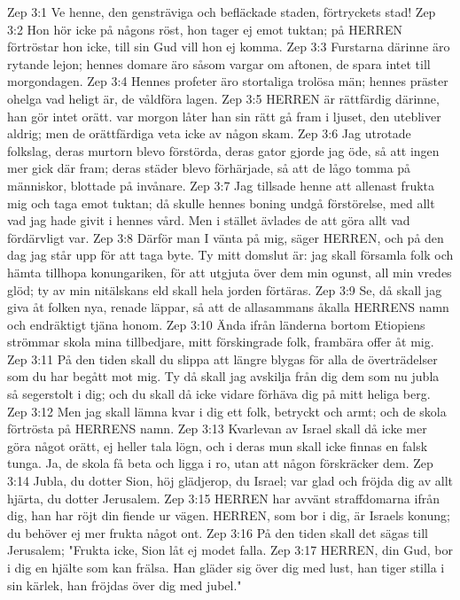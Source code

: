 Zep 3:1  Ve henne, den gensträviga och befläckade staden, förtryckets stad!
Zep 3:2  Hon hör icke på någons röst, hon tager ej emot tuktan; på HERREN förtröstar hon icke, till sin Gud vill hon ej komma.
Zep 3:3  Furstarna därinne äro rytande lejon; hennes domare äro såsom vargar om aftonen, de spara intet till morgondagen.
Zep 3:4  Hennes profeter äro stortaliga trolösa män; hennes präster ohelga vad heligt är, de våldföra lagen.
Zep 3:5  HERREN är rättfärdig därinne, han gör intet orätt. var morgon låter han sin rätt gå fram i ljuset, den utebliver aldrig; men de orättfärdiga veta icke av någon skam.
Zep 3:6  Jag utrotade folkslag, deras murtorn blevo förstörda, deras gator gjorde jag öde, så att ingen mer gick där fram; deras städer blevo förhärjade, så att de lågo tomma på människor, blottade på invånare.
Zep 3:7  Jag tillsade henne att allenast frukta mig och taga emot tuktan; då skulle hennes boning undgå förstörelse, med allt vad jag hade givit i hennes vård. Men i stället ävlades de att göra allt vad fördärvligt var.
Zep 3:8  Därför man I vänta på mig, säger HERREN, och på den dag jag står upp för att taga byte. Ty mitt domslut är: jag skall församla folk och hämta tillhopa konungariken, för att utgjuta över dem min ogunst, all min vredes glöd; ty av min nitälskans eld skall hela jorden förtäras.
Zep 3:9  Se, då skall jag giva åt folken nya, renade läppar, så att de allasammans åkalla HERRENS namn och endräktigt tjäna honom.
Zep 3:10  Ända ifrån länderna bortom Etiopiens strömmar skola mina tillbedjare, mitt förskingrade folk, frambära offer åt mig.
Zep 3:11  På den tiden skall du slippa att längre blygas för alla de överträdelser som du har begått mot mig. Ty då skall jag avskilja från dig dem som nu jubla så segerstolt i dig; och du skall då icke vidare förhäva dig på mitt heliga berg.
Zep 3:12  Men jag skall lämna kvar i dig ett folk, betryckt och armt; och de skola förtrösta på HERRENS namn.
Zep 3:13  Kvarlevan av Israel skall då icke mer göra något orätt, ej heller tala lögn, och i deras mun skall icke finnas en falsk tunga. Ja, de skola få beta och ligga i ro, utan att någon förskräcker dem.
Zep 3:14  Jubla, du dotter Sion, höj glädjerop, du Israel; var glad och fröjda dig av allt hjärta, du dotter Jerusalem.
Zep 3:15  HERREN har avvänt straffdomarna ifrån dig, han har röjt din fiende ur vägen. HERREN, som bor i dig, är Israels konung; du behöver ej mer frukta något ont.
Zep 3:16  På den tiden skall det sägas till Jerusalem; "Frukta icke, Sion låt ej modet falla.
Zep 3:17  HERREN, din Gud, bor i dig en hjälte som kan frälsa. Han gläder sig över dig med lust, han tiger stilla i sin kärlek, han fröjdas över dig med jubel."
